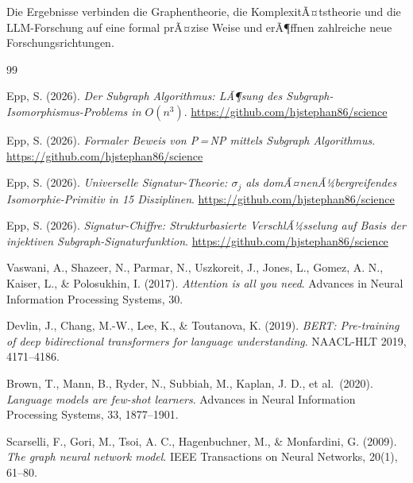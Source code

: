 ﻿\documentclass[a4paper,12pt]{article}
\theoremstyle{definition}
\begin{document}
Die Ergebnisse verbinden die Graphentheorie, die KomplexitÃ¤tstheorie und
die LLM-Forschung auf eine formal prÃ¤zise Weise und erÃ¶ffnen zahlreiche
neue Forschungsrichtungen.

\begin{thebibliography}{99}

Epp, S. (2026).
\textit{Der Subgraph Algorithmus: LÃ¶sung des Subgraph-Isomorphismus-Problems
in $O(n^3)$}.
\url{https://github.com/hjstephan86/science}

Epp, S. (2026).
\textit{Formaler Beweis von P\,=\,NP mittels Subgraph Algorithmus}.
\url{https://github.com/hjstephan86/science}

Epp, S. (2026).
\textit{Universelle Signatur-Theorie: $\sigma_j$ als domÃ¤nenÃ¼bergreifendes
Isomorphie-Primitiv in 15 Disziplinen}.
\url{https://github.com/hjstephan86/science}

Epp, S. (2026).
\textit{Signatur-Chiffre: Strukturbasierte VerschlÃ¼sselung auf Basis
der injektiven Subgraph-Signaturfunktion}.
\url{https://github.com/hjstephan86/science}

Vaswani, A., Shazeer, N., Parmar, N., Uszkoreit, J., Jones, L.,
Gomez, A. N., Kaiser, L., \& Polosukhin, I. (2017).
\textit{Attention is all you need}.
Advances in Neural Information Processing Systems, 30.

Devlin, J., Chang, M.-W., Lee, K., \& Toutanova, K. (2019).
\textit{BERT: Pre-training of deep bidirectional transformers for
language understanding}.
NAACL-HLT 2019, 4171--4186.

Brown, T., Mann, B., Ryder, N., Subbiah, M., Kaplan, J. D., et al.\ (2020).
\textit{Language models are few-shot learners}.
Advances in Neural Information Processing Systems, 33, 1877--1901.

Scarselli, F., Gori, M., Tsoi, A. C., Hagenbuchner, M., \& Monfardini, G.
(2009).
\textit{The graph neural network model}.
IEEE Transactions on Neural Networks, 20(1), 61--80.


\end{thebibliography}
\end{document}
